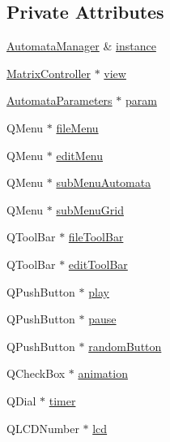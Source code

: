 \subsection*{Private Attributes}
\begin{DoxyCompactItemize}
\item 
\mbox{\hyperlink{class_automata_manager}{Automata\+Manager}} \& \mbox{\hyperlink{class_main_controller_ad926f088465fb1b7bbb181a4502aaad0}{instance}}
\item 
\mbox{\hyperlink{class_matrix_controller}{Matrix\+Controller}} $\ast$ \mbox{\hyperlink{class_main_controller_a24cdae20cbd62e663687fa079c23e83a}{view}}
\item 
\mbox{\hyperlink{class_automata_parameters}{Automata\+Parameters}} $\ast$ \mbox{\hyperlink{class_main_controller_a2c25d49c63992a3b1bcf312c2e02bb23}{param}}
\item 
Q\+Menu $\ast$ \mbox{\hyperlink{class_main_controller_a9b3df60ee05928b0296baf0b1051f261}{file\+Menu}}
\item 
Q\+Menu $\ast$ \mbox{\hyperlink{class_main_controller_a5ab07a811583fbca2549dbcd9919f71c}{edit\+Menu}}
\item 
Q\+Menu $\ast$ \mbox{\hyperlink{class_main_controller_a5242aa3227785bd402ab0e0e45d076e4}{sub\+Menu\+Automata}}
\item 
Q\+Menu $\ast$ \mbox{\hyperlink{class_main_controller_abbba1dcac884825de03d3b98835a7234}{sub\+Menu\+Grid}}
\item 
Q\+Tool\+Bar $\ast$ \mbox{\hyperlink{class_main_controller_a7c3800aaf55172aa565065272418f7f4}{file\+Tool\+Bar}}
\item 
Q\+Tool\+Bar $\ast$ \mbox{\hyperlink{class_main_controller_aee0527d0771c64102a9a3cdeb59024b0}{edit\+Tool\+Bar}}
\item 
Q\+Push\+Button $\ast$ \mbox{\hyperlink{class_main_controller_a710fae19858502fb93e097f12dca31f1}{play}}
\item 
Q\+Push\+Button $\ast$ \mbox{\hyperlink{class_main_controller_a76a6260f498cf6375d49e041a15ed2a3}{pause}}
\item 
Q\+Push\+Button $\ast$ \mbox{\hyperlink{class_main_controller_a122c813df75cca4a64b986ce826bb5a9}{random\+Button}}
\item 
Q\+Check\+Box $\ast$ \mbox{\hyperlink{class_main_controller_ac2739da22542b801ef4859087208cf54}{animation}}
\item 
Q\+Dial $\ast$ \mbox{\hyperlink{class_main_controller_a6c3d268678f6be5a53f30cc3c4a9aae3}{timer}}
\item 
Q\+L\+C\+D\+Number $\ast$ \mbox{\hyperlink{class_main_controller_a663d9bd8f3ca551a0634c9ff6e65be77}{lcd}}

\end{DoxyCompactItemize}
